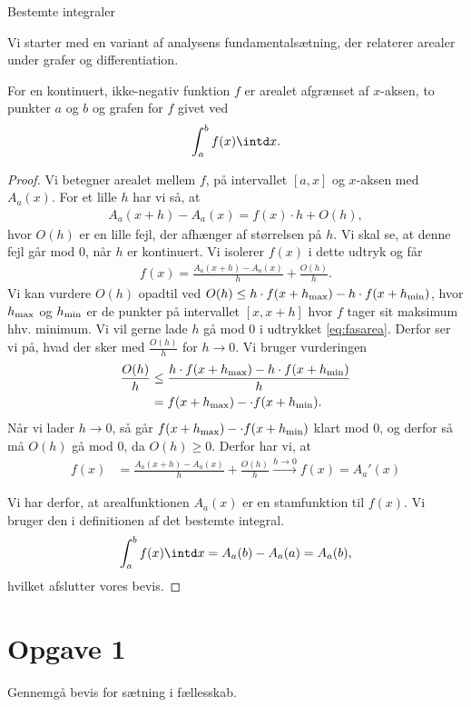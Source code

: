 \begin{center}
\Huge
Bestemte integraler
\end{center}
Vi starter med en variant af analysens fundamentalsætning, der relaterer arealer under grafer og differentiation.
\begin{setn}
For en kontinuert, ikke-negativ funktion $f$ er arealet afgrænset af $x$-aksen, to punkter $a$ og $b$ og grafen for $f$ givet ved
\begin{align*}
\int_a^bf(x)\intd x.
\end{align*} 
\end{setn}
\begin{proof}
Vi betegner arealet mellem $f$, på intervallet $[a,x]$ og $x$-aksen med $A_a(x)$. For et lille $h$ har vi så, at 
\begin{align*}
A_a(x+h)-A_a(x) = f(x)\cdot h + O(h), 
\end{align*}
hvor $O(h)$ er en lille fejl, der afhænger af størrelsen på $h$. Vi skal se, at denne fejl går mod $0$, når $h$ er kontinuert. Vi isolerer $f(x)$ i dette udtryk og får
\begin{align}\label{eq:fasarea}
f(x) = \frac{A_a(x+h)-A_a(x)}{h} + \frac{O(h)}{h}.
\end{align}
Vi kan vurdere $O(h)$ opadtil ved $O(h) \leq h\cdot f(x+h_{\textnormal{max}})-h\cdot f(x+h_{\textnormal{min}})$, hvor $h_{\textnormal{max}}$ og $h_{\textnormal{min}}$ er de punkter på intervallet $[x,x+h]$ hvor $f$ tager sit maksimum hhv. minimum. Vi vil gerne lade $h$ gå mod $0$ i udtrykket \eqref{eq:fasarea}. Derfor ser vi på, hvad der sker med $\frac{O(h)}{h}$ for $h\to 0$. Vi bruger vurderingen
\begin{align*}
\frac{O(h)}{h} &\leq  \frac{ h\cdot f(x+h_{\textnormal{max}})-h\cdot f(x+h_{\textnormal{min}})}{h}\\ 
&= f(x+h_{\textnormal{max}})-\cdot f(x+h_{\textnormal{min}}).
\end{align*}
Når vi lader $h\to 0$, så går $f(x+h_{\textnormal{max}})-\cdot f(x+h_{\textnormal{min}})$ klart mod $0$, og derfor så må $O(h)$ gå mod 0, da $O(h)\geq 0$. Derfor har vi, at 
\begin{align*}
f(x) &= \frac{A_a(x+h)-A_a(x)}{h} + \frac{O(h)}{h} \overset{h\rightarrow 0}{\longrightarrow} f(x)=A_a'(x)
\end{align*}

Vi har derfor, at arealfunktionen $A_a(x)$ er en stamfunktion til $f(x)$. Vi bruger den i definitionen af det bestemte integral.
\begin{align*}
\int_a^bf(x) \intd x = A_a(b)-A_a(a) = A_a(b),
\end{align*}
hvilket afslutter vores bevis.
\end{proof}

\section*{Opgave 1}
Gennemgå bevis for sætning i fællesskab.
